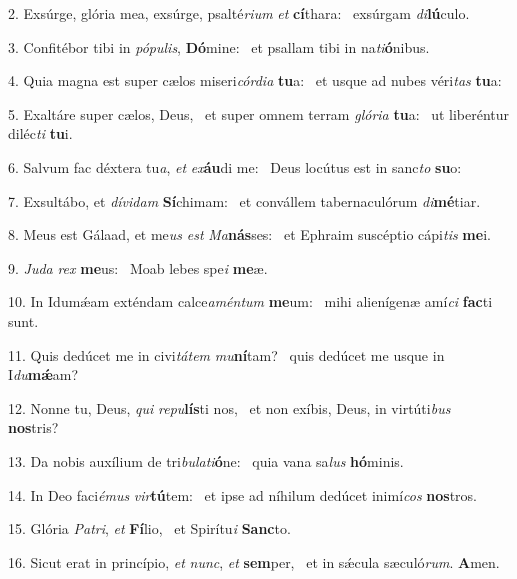 2. Exsúrge, glória mea, exsúrge, psalté\textit{ri}\textit{um} \textit{et} \textbf{cí}thara: \ast\  exsúrgam \textit{di}\textbf{lú}culo.\

3. Confitébor tibi in \textit{pó}\textit{pu}\textit{lis}, \textbf{Dó}mine: \ast\  et psallam tibi in na\textit{ti}\textbf{ó}nibus.\

4. Quia magna est super cælos miseri\textit{cór}\textit{di}\textit{a} \textbf{tu}a: \ast\  et usque ad nubes véri\textit{tas} \textbf{tu}a:\

5. Exaltáre super cælos, Deus, \dag\  et super omnem terram \textit{gló}\textit{ri}\textit{a} \textbf{tu}a: \ast\  ut liberéntur diléc\textit{ti} \textbf{tu}i.\

6. Salvum fac déxtera tu\textit{a}, \textit{et} \textit{ex}\textbf{áu}di me: \ast\  Deus locútus est in sanc\textit{to} \textbf{su}o:\

7. Exsultábo, et \textit{dí}\textit{vi}\textit{dam} \textbf{Sí}chimam: \ast\  et convállem tabernaculórum \textit{di}\textbf{mé}tiar.\

8. Meus est Gálaad, et me\textit{us} \textit{est} \textit{Ma}\textbf{nás}ses: \ast\  et Ephraim suscéptio cápi\textit{tis} \textbf{me}i.\

9. \textit{Ju}\textit{da} \textit{rex} \textbf{me}us: \ast\  Moab lebes spe\textit{i} \textbf{me}æ.\

10. In Idumǽam exténdam calce\textit{a}\textit{mén}\textit{tum} \textbf{me}um: \ast\  mihi alienígenæ amí\textit{ci} \textbf{fac}ti sunt.\

11. Quis dedúcet me in civi\textit{tá}\textit{tem} \textit{mu}\textbf{ní}tam? \ast\  quis dedúcet me usque in I\textit{du}\textbf{mǽ}am?\

12. Nonne tu, Deus, \textit{qui} \textit{re}\textit{pu}\textbf{lís}ti nos, \ast\  et non exíbis, Deus, in virtúti\textit{bus} \textbf{nos}tris?\

13. Da nobis auxílium de tri\textit{bu}\textit{la}\textit{ti}\textbf{ó}ne: \ast\  quia vana sa\textit{lus} \textbf{hó}minis.\

14. In Deo faci\textit{é}\textit{mus} \textit{vir}\textbf{tú}tem: \ast\  et ipse ad níhilum dedúcet inimí\textit{cos} \textbf{nos}tros.\

15. Glória \textit{Pa}\textit{tri}, \textit{et} \textbf{Fí}lio, \ast\  et Spirítu\textit{i} \textbf{Sanc}to.\

16. Sicut erat in princípio, \textit{et} \textit{nunc}, \textit{et} \textbf{sem}per, \ast\  et in sǽcula sæculó\textit{rum}. \textbf{A}men.\

